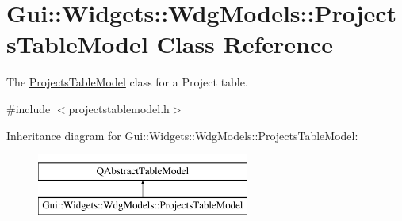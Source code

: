 \hypertarget{classGui_1_1Widgets_1_1WdgModels_1_1ProjectsTableModel}{}\section{Gui\+:\+:Widgets\+:\+:Wdg\+Models\+:\+:Projects\+Table\+Model Class Reference}
\label{classGui_1_1Widgets_1_1WdgModels_1_1ProjectsTableModel}


The \hyperlink{classGui_1_1Widgets_1_1WdgModels_1_1ProjectsTableModel}{Projects\+Table\+Model} class for a Project table.  




{\ttfamily \#include $<$projectstablemodel.\+h$>$}

Inheritance diagram for Gui\+:\+:Widgets\+:\+:Wdg\+Models\+:\+:Projects\+Table\+Model\+:\begin{figure}[H]
\begin{center}
\leavevmode
\includegraphics[height=2.000000cm]{d3/d40/classGui_1_1Widgets_1_1WdgModels_1_1ProjectsTableModel}
\end{center}
\end{figure}
